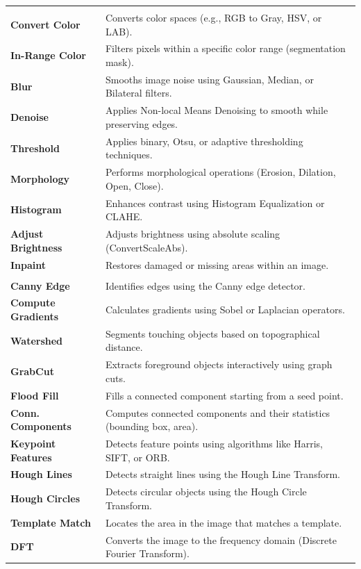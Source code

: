 \documentclass[runningheads]{llncs}
\begin{document}
\begin{table}[tb]
\begin{tabularx}{\textwidth}{>{\bfseries}l X}
        \rowcolor{gray!15} \multicolumn{2}{c}{\textbf{\textsc{Enhancement}}} \\
        Convert Color & Converts color spaces (e.g., RGB to Gray, HSV, or LAB). \\
        In-Range Color & Filters pixels within a specific color range (segmentation mask). \\
        Blur & Smooths image noise using Gaussian, Median, or Bilateral filters. \\
        Denoise & Applies Non-local Means Denoising to smooth while preserving edges. \\
        Threshold & Applies binary, Otsu, or adaptive thresholding techniques. \\
        Morphology & Performs morphological operations (Erosion, Dilation, Open, Close). \\
        Histogram & Enhances contrast using Histogram Equalization or CLAHE. \\
        Adjust Brightness & Adjusts brightness using absolute scaling (ConvertScaleAbs). \\
        Inpaint & Restores damaged or missing areas within an image. \\
        
        \rowcolor{gray!15} \multicolumn{2}{c}{\textbf{\textsc{Feature Extraction}}} \\
        Canny Edge & Identifies edges using the Canny edge detector. \\
        Compute Gradients & Calculates gradients using Sobel or Laplacian operators. \\
        Watershed & Segments touching objects based on topographical distance. \\
        GrabCut & Extracts foreground objects interactively using graph cuts. \\
        Flood Fill & Fills a connected component starting from a seed point. \\
        Conn. Components & Computes connected components and their statistics (bounding box, area). \\
        Keypoint Features & Detects feature points using algorithms like Harris, SIFT, or ORB. \\
        Hough Lines & Detects straight lines using the Hough Line Transform. \\
        Hough Circles & Detects circular objects using the Hough Circle Transform. \\
        Template Match & Locates the area in the image that matches a template. \\
        DFT & Converts the image to the frequency domain (Discrete Fourier Transform). \\
        

\end{tabularx}
\end{table}
\end{document}
